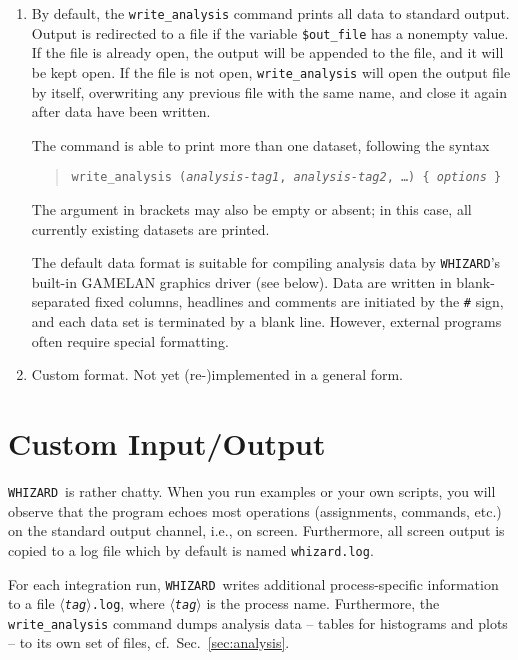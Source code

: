 \documentclass[12pt]{book}
\newcommand{\var}[1]{$\langle$\textit{#1}$\rangle$}
\newcommand{\ttt}[1]{\texttt{#1}}
\newcommand{\whizard}{\texttt{WHIZARD}}
\begin{document}
\begin{enumerate}
\item
By default, the \ttt{write\_analysis} command prints all data to standard
output.  Output is redirected to a file if the variable \ttt{\$out\_file} has
a nonempty value.  If the file is already open, the output will be appended to
the file, and it will be kept open.  If the file is not open,
\ttt{write\_analysis} will open the output file by itself, overwriting any
previous file with the same name, and close it again after data have been
written.

The command is able to print more than one dataset, following the syntax
\begin{quote}
  \begin{footnotesize}
  \ttt{write\_analysis (\emph{analysis-tag1}, \emph{analysis-tag2}, \ldots)
  \{ \emph{options} \}}
  \end{footnotesize}
\end{quote}
The argument in brackets may also be empty or absent; in this case, all
currently existing datasets are printed.

The default data format is suitable for compiling analysis data by \whizard's
built-in GAMELAN graphics driver (see below).  Data are written in
blank-separated fixed columns, headlines and comments are initiated by the
\verb|#| sign, and each data set is terminated by a blank line.  However,
external programs often require special formatting.

\item
Custom format. Not yet (re-)implemented in a general form.
\end{enumerate}


\section{Custom Input/Output}
\label{sec:I/O}

\whizard\ is rather chatty.  When you run examples or your own scripts, you
will observe that the program echoes most operations (assignments, commands,
etc.) on the standard output channel, i.e., on screen.  Furthermore, all
screen output is copied to a log file which by default is named
\ttt{whizard.log}.

For each integration run, \whizard\ writes additional process-specific
information to a file \ttt{\var{tag}.log}, where \ttt{\var{tag}} is the
process name.  Furthermore, the \ttt{write\_analysis} command dumps analysis
data -- tables for histograms and plots -- to its own set of files, cf.\ 
Sec.~\ref{sec:analysis}.
\end{document}
